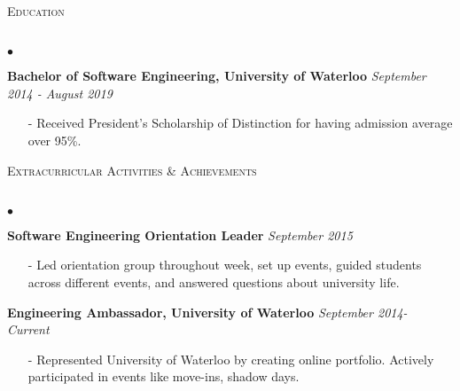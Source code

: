 \documentclass[10pt]{article}
\newcommand{\lineunder}{\vspace*{-8pt} \\ \hspace*{-18pt} \hrulefill \\}
\newcommand{\header}[1]{{\hspace*{-15pt}\vspace*{6pt} \textsc{#1}} \vspace*{-6pt} \lineunder }
\newenvironment{achievements}{\begin{list}{$\bullet$}{\topsep 0pt \itemsep -1.5pt \leftmargin 5pt}}{\vspace*{4pt}\end{list}}
\begin{document}
\vspace{8pt}

\header{\fontsize{11}{12}\selectfont  Education}
\begin{achievements}
\item \textbf{Bachelor of Software Engineering, University of Waterloo} \hfill \textit {September 2014 - August 2019}
\begin{itemize}
\item[-]Received President’s Scholarship of Distinction for having admission average over 95\%.
\vspace{2pt}
\end{itemize}
\end{achievements}

\vspace{8pt}

\header{\fontsize{11}{12}\selectfont Extracurricular Activities \& Achievements}
\begin{achievements}
\item \textbf{Software Engineering Orientation Leader} \hfill \textit {September 2015}
\begin{itemize}
\item[-] Led orientation group throughout week, set up events, guided students across different events, and answered questions about university life.
\end{itemize}
\vspace{2pt}
\item \textbf{Engineering Ambassador, University of Waterloo} \hfill \textit {September 2014- Current}
\begin{itemize}
\item[-] Represented University of Waterloo by creating online portfolio. Actively participated in events like move-ins, shadow days.
\end{itemize}
\end{achievements}
\end{document}

